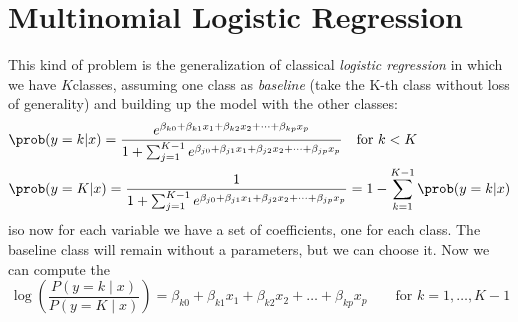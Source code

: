 \section{Multinomial Logistic Regression}
This kind of problem is the generalization of classical \textit{logistic regression} in which we have $K$classes, assuming one class as \textit{baseline} (take the K-th class without loss of generality) and building up the model with the other classes:
\begin{align}
&\prob(y = k | x) = \frac{e^{\beta_{k0} + \beta_{k1} x_1 + \beta_{k2} x_2 + \dots + \beta_{kp} x_p}}{1 + \sum_{j=1}^{K-1} e^{\beta_{j0} + \beta_{j1} x_1 + \beta_{j2} x_2 + \dots + \beta_{jp} x_p}} \quad\text{for }k < K \\
&\prob(y = K | x) = \frac{1}{1 + \sum_{j=1}^{K-1} e^{\beta_{j0} + \beta_{j1} x_1 + \beta_{j2} x_2 + \dots + \beta_{jp} x_p}} = 1 - \sum_{k=1}^{K-1} \prob(y = k | x)
\end{align}
iso now for each variable we have a set of coefficients, one for each class. The baseline class will remain without a parameters, but we can choose it.
Now we can compute the 
$$
\log\left(
\frac{P(y = k \mid x)}
     {P(y = K \mid x)}
\right)
=
\beta_{k0}
+
\beta_{k1}x_1
+
\beta_{k2}x_2
+
\dots
+
\beta_{kp}x_p
\qquad \text{for } k = 1, \dots, K-1
$$
